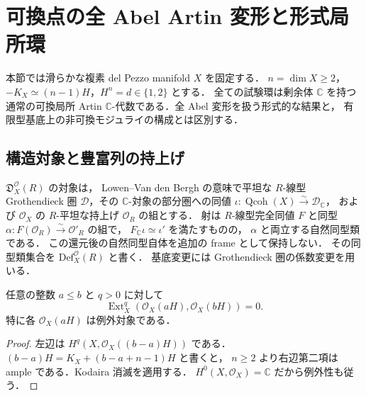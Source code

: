 \section{可換点の全 Abel Artin 変形と形式局所環}
\label{sec:formal-abel}

本節では滑らかな複素 del Pezzo manifold $X$ を固定する．
$n=\dim X\geq2$，$-K_X\simeq(n-1)H$，$H^n=d\in\{1,2\}$ とする．
全ての試験環は剰余体 $\mathbb C$ を持つ通常の可換局所 Artin
$\mathbb C$-代数である．全 Abel 変形を扱う形式的な結果と，
有限型基底上の非可換モジュライの構成とは区別する．

\subsection{構造対象と豊富列の持上げ}

\begin{definition}
\label{def:framed-o-abel}
$\mathfrak D^{\mathcal O}_X(R)$ の対象は，
Lowen--Van den Bergh の意味で平坦な $R$-線型 Grothendieck 圏
$\mathcal D$，その $\mathbb C$-対象の部分圏への同値
$\iota:\operatorname{Qcoh}(X)\xrightarrow{\sim}\mathcal D_{\mathbb C}$，
および $\mathcal O_X$ の $R$-平坦な持上げ $\mathcal O_R$ の組とする．
射は $R$-線型完全同値 $F$ と同型
$\alpha:F(\mathcal O_R)\xrightarrow{\sim}\mathcal O'_R$ の組で，
$F_{\mathbb C}\iota\simeq\iota'$ を満たすものの，
$\alpha$ と両立する自然同型類である．
この還元後の自然同型自体を追加の frame として保持しない．
その同型類集合を $\mathrm{Def}^{\mathcal O}_X(R)$ と書く．
基底変更には Grothendieck 圏の係数変更を用いる．
\end{definition}

\begin{lemma}[有向な線対象列の消滅]
\label{lem:directed-line-vanishing}
任意の整数 $a\leq b$ と $q>0$ に対して
\[
 \operatorname{Ext}^q_X(\mathcal O_X(aH),\mathcal O_X(bH))=0.
\]
特に各 $\mathcal O_X(aH)$ は例外対象である．
\end{lemma}
\begin{proof}
左辺は $H^q(X,\mathcal O_X((b-a)H))$ である．
$(b-a)H=K_X+(b-a+n-1)H$ と書くと，
$n\geq2$ より右辺第二項は ample である．Kodaira 消滅を適用する．
$H^0(X,\mathcal O_X)=\mathbb C$ だから例外性も従う．
\end{proof}

